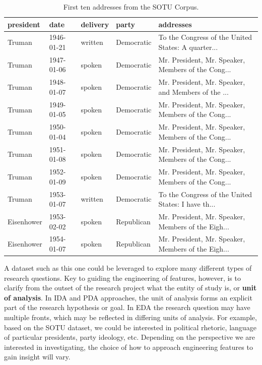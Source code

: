 \documentclass[
  letterpaper,
]{scrbook}
\begin{document}
\hypertarget{tbl-eda-sotu-corpus}{}
\begin{table}
\caption{\label{tbl-eda-sotu-corpus}First ten addresses from the SOTU Corpus. }\tabularnewline

\centering
\begin{tabular}{l|l|l|l|l}
\hline
president & date & delivery & party & addresses\\
\hline
Truman & 1946-01-21 & written & Democratic & To the Congress of the United States: A quarter...\\
\hline
Truman & 1947-01-06 & spoken & Democratic & Mr. President, Mr. Speaker, Members of the Cong...\\
\hline
Truman & 1948-01-07 & spoken & Democratic & Mr. President, Mr. Speaker, and Members of the ...\\
\hline
Truman & 1949-01-05 & spoken & Democratic & Mr. President, Mr. Speaker, Members of the Cong...\\
\hline
Truman & 1950-01-04 & spoken & Democratic & Mr. President, Mr. Speaker, Members of the Cong...\\
\hline
Truman & 1951-01-08 & spoken & Democratic & Mr. President, Mr. Speaker, Members of the Cong...\\
\hline
Truman & 1952-01-09 & spoken & Democratic & Mr. President, Mr. Speaker, Members of the Cong...\\
\hline
Truman & 1953-01-07 & written & Democratic & To the Congress of the United States: I have th...\\
\hline
Eisenhower & 1953-02-02 & spoken & Republican & Mr. President, Mr. Speaker, Members of the Eigh...\\
\hline
Eisenhower & 1954-01-07 & spoken & Republican & Mr. President, Mr. Speaker, Members of the Eigh...\\
\hline
\end{tabular}
\end{table}

A dataset such as this one could be leveraged to explore many different
types of research questions. Key to guiding the engineering of features,
however, is to clarify from the outset of the research project what the
entity of study is, or \textbf{unit of analysis}. In IDA and PDA
approaches, the unit of analysis forms an explicit part of the research
hypothesis or goal. In EDA the research question may have multiple
fronts, which may be reflected in differing units of analysis. For
example, based on the SOTU dataset, we could be interested in political
rhetoric, language of particular presidents, party ideology, etc.
Depending on the perspective we are interested in investigating, the
choice of how to approach engineering features to gain insight will
vary.
\end{document}
